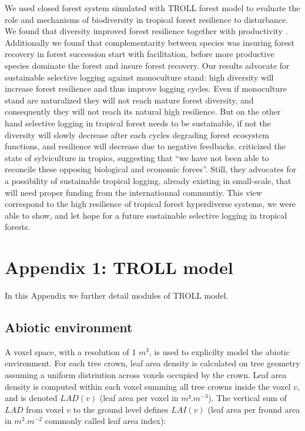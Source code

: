 \documentclass[12pt,]{article}
\let\oldsection\section
\renewcommand\section{\newpage\oldsection}
\theoremstyle{definition}
\theoremstyle{definition}
\theoremstyle{remark}
\begin{document}
We used closed forest system simulated with TROLL forest model to
evaluate the role and mechanisms of biodiversity in tropical forest
resilience to disturbance. We found that diversity improved forest
resilience together with productivity \citep{Liang2016}. Additionally we
found that complementarity between species was insuring forest recovery
in forest succession start with facilitation, before more productive
species dominate the forest and insure forest recovery. Our results
advocate for sustainable selective logging against monoculture stand:
high diversity will increase forest resilience and thus improve logging
cycles. Even if monoculture stand are naturalized they will not reach
mature forest diversity, and consequently they will not reach its
natural high resilience. But on the other hand selective logging in
tropical forest needs to be sustainable, if not the diversity will
slowly decrease after each cycles degrading forest ecosystem functions,
and resilience will decrease due to negative feedbacks.
\citet{Zimmerman2012} criticized the state of sylviculture in tropics,
suggesting that ``we have not been able to reconcile these opposing
biological and economic forces''. Still, they advocates for a
possibility of sustainable tropical logging, already existing in
small-scale, that will need proper funding from the internationnal
communtiy. This view correspond to the high resilience of tropical
forest hyperdiverse systems, we were able to show, and let hope for a
future sustainable selective logging in tropical forests.

\appendix


\hypertarget{appendix-1-troll-model}{\section{Appendix 1: TROLL
model}\label{appendix-1-troll-model}}

In this Appendix we further detail modules of TROLL model.

\subsection{Abiotic environment}\label{abiotic-environment}

A voxel space, with a resolution of 1 \(m^3\), is used to explicilty
model the abiotic environment. For each tree crown, leaf area density is
calculated on tree geometry assuming a uniform distriution across voxels
occupied by the crown. Leaf area density is computed within each voxel
summing all tree crowns inside the voxel \(v\), and is denoted
\(LAD(v)\) (leaf area per voxel in \(m².m^{-3}\)). The vertical sum of
\(LAD\) from voxel \(v\) to the ground level defines \(LAI(v)\) (leaf
area per fround area in \(m^2.m^{-2}\) commonly called leaf area index):
\end{document}
